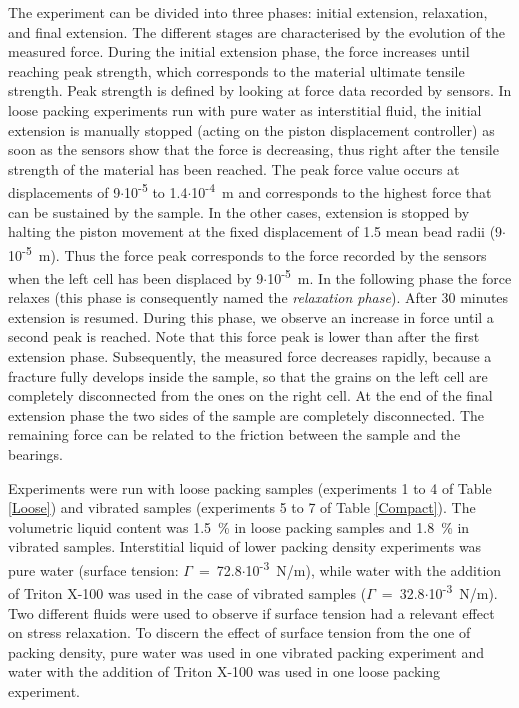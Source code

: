 The experiment can be divided into three phases: initial extension, relaxation, and final extension. The different stages are characterised by the evolution of the measured force. During the initial extension phase, the force increases until reaching peak strength, which corresponds to the material ultimate tensile strength. Peak strength is defined by looking at force data recorded by sensors. In loose packing experiments run with pure water as interstitial fluid, the initial extension is manually stopped (acting on the piston displacement controller) as soon as the sensors show that the force is decreasing, thus right after the tensile strength of the material has been reached. The peak force value occurs at displacements of 9$\cdot$10\textsuperscript{-5} to 1.4$\cdot$10\textsuperscript{-4}~\si{\metre} and corresponds to the highest force that can be sustained by the sample. In the other cases, extension is stopped by halting the piston movement at the fixed displacement of 1.5 mean bead radii (9$\cdot$10\textsuperscript{-5}~\si{\metre}). Thus the force peak corresponds to the force recorded by the sensors when the left cell has been displaced by 9$\cdot$10\textsuperscript{-5}~\si{\metre}. In the following phase the force relaxes (this phase is consequently named the \textit{relaxation phase}). After 30 minutes extension is resumed. During this phase, we observe an increase in force until a second peak is reached. Note that this force peak is lower than after the first extension phase. Subsequently, the measured force decreases rapidly, because a fracture fully develops inside the sample, so that the grains on the left cell are completely disconnected from the ones on the right cell. At the end of the final extension phase the two sides of the sample are completely disconnected. The remaining force can be related to the friction between the sample and the bearings.

Experiments were run with loose packing samples (experiments 1 to 4 of Table \ref{Loose}) and vibrated samples (experiments 5 to 7 of Table \ref{Compact}). The volumetric liquid content was 1.5~\% in loose packing samples and 1.8~\% in vibrated samples. Interstitial liquid of lower packing density experiments was pure water (surface tension: $\Gamma$~=~72.8$\cdot$10\textsuperscript{-3}~\si{N/m}), while water with the addition of Triton X-100 was used in the case of vibrated samples ($\Gamma$~=~32.8$\cdot$10\textsuperscript{-3}~\si{N/m}). Two different fluids were used to observe if surface tension had a relevant effect on stress relaxation. To discern the effect of surface tension from the one of packing density, pure water was used in one vibrated packing experiment and water with the addition of Triton X-100 was used in one loose packing experiment.


